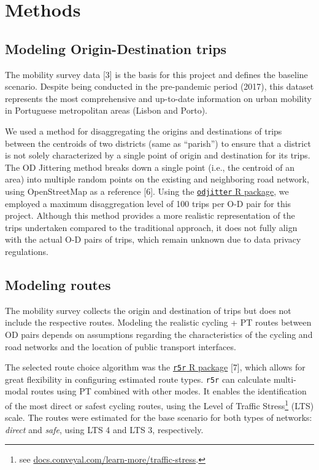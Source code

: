 \documentclass[runningheads]{llncs}
\begin{document}
\section{Methods}\label{methods}

\subsection{Modeling Origin-Destination
trips}\label{modeling-origin-destination-trips}

The mobility survey data {[}3{]} is the basis for this project and
defines the baseline scenario. Despite being conducted in the
pre-pandemic period (2017), this dataset represents the most
comprehensive and up-to-date information on urban mobility in Portuguese
metropolitan areas (Lisbon and Porto).

We used a method for disaggregating the origins and destinations of
trips between the centroids of two districts (same as ``parish'') to
ensure that a district is not solely characterized by a single point of
origin and destination for its trips. The OD Jittering method breaks
down a single point (i.e., the centroid of an area) into multiple random
points on the existing and neighboring road network, using OpenStreetMap
as a reference {[}6{]}. Using the
\href{https://github.com/dabreegster/odjitter}{\texttt{odjitter} R
package}, we employed a maximum disaggregation level of 100 trips per
O-D pair for this project. Although this method provides a more
realistic representation of the trips undertaken compared to the
traditional approach, it does not fully align with the actual O-D pairs
of trips, which remain unknown due to data privacy regulations.

\subsection{Modeling routes}\label{modeling-routes}

The mobility survey collects the origin and destination of trips but
does not include the respective routes. Modeling the realistic cycling +
PT routes between OD pairs depends on assumptions regarding the
characteristics of the cycling and road networks and the location of
public transport interfaces.

The selected route choice algorithm was the
\href{https://ipeagit.github.io/r5r/}{\texttt{r5r} R package} {[}7{]},
which allows for great flexibility in configuring estimated route types.
\texttt{r5r} can calculate multi-modal routes using PT combined with
other modes. It enables the identification of the most direct or safest
cycling routes, using the Level of Traffic Stress\footnote{see
  \href{https://docs.conveyal.com/learn-more/traffic-stress}{docs.conveyal.com/learn-more/traffic-stress}.}
(LTS) scale. The routes were estimated for the base scenario for both
types of networks: \emph{direct} and \emph{safe}, using LTS 4 and LTS 3,
respectively.
\end{document}
